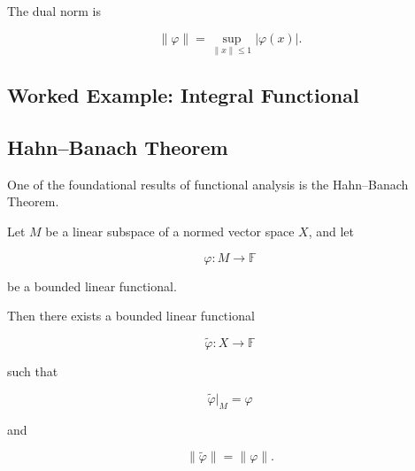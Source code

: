 The dual norm is

\[
\boxed{
\|\varphi\|
=
\sup_{\|x\|\leq1}
|\varphi(x)|.
}
\]

\subsection{Worked Example: Integral Functional}
\label{subsec:worked-integral-functional}


\subsection{Hahn--Banach Theorem}
\label{subsec:hahn-banach-theorem}

One of the foundational results of functional analysis is the
Hahn--Banach Theorem.

\begin{theorem}
Let \(M\) be a linear subspace of a normed vector space \(X\), and let

\[
\varphi:M\to\mathbb{F}
\]

be a bounded linear functional.

Then there exists a bounded linear functional

\[
\widetilde{\varphi}:X\to\mathbb{F}
\]

such that

\[
\boxed{
\widetilde{\varphi}|_M=\varphi
}
\]

and

\[
\boxed{
\|\widetilde{\varphi}\|
=
\|\varphi\|.
}
\]
\end{theorem}

